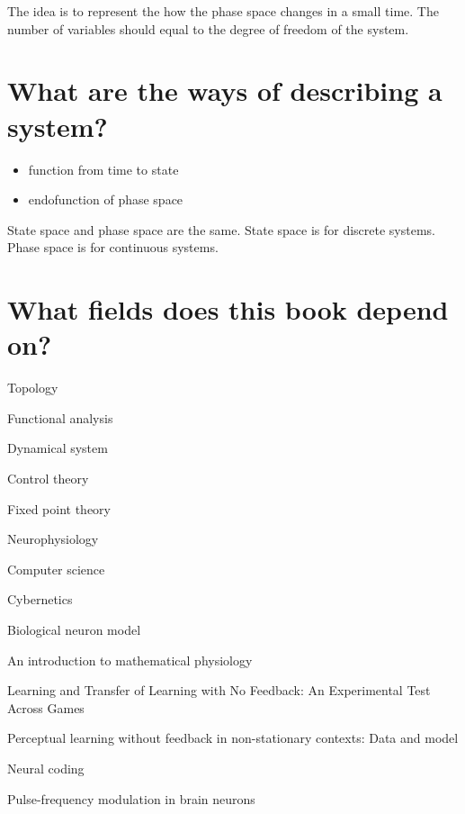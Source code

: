 The idea is to represent the how the phase space changes in a small time.
The number of variables should equal to the degree of freedom of the system.

\section{What are the ways of describing a system?}

\begin{itemize}
    \item function from time to state
    \item endofunction of phase space
\end{itemize}

State space and phase space are the same.
State space is for discrete systems.
Phase space is for continuous systems.

\section{What fields does this book depend on?}

Topology \cite{Topology}

Functional analysis

Dynamical system

Control theory

Fixed point theory

Neurophysiology

Computer science

Cybernetics


Biological neuron model

An introduction to mathematical physiology

Learning and Transfer of Learning with No Feedback: An Experimental Test Across Games

Perceptual learning without feedback in non-stationary contexts: Data and model

Neural coding

Pulse-frequency modulation in brain neurons

